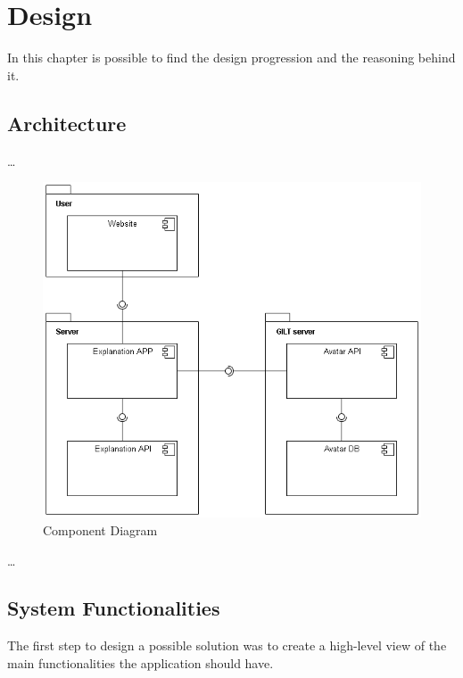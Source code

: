 
\chapter{Design} %
\label{chap:Chapter4} 

In this chapter is possible to find the design progression and the reasoning behind it.

\section{Architecture}

\dots

\begin{figure}[H]
\centering
\includegraphics[scale=0.5]{ch4/assets/component_diagram.png}
\caption[Component Diagram]{Component Diagram}
\label{fig:cd}
\end{figure}

\dots

\section{System Functionalities}

The first step to design a possible solution was to create a high-level view of the main functionalities the application should have.

